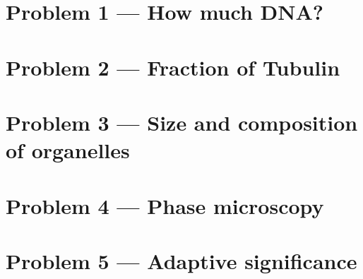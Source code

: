 \documentclass[11pt]{article}
\begin{document}
\section{Problem 1 --- How much DNA?}


\section{Problem 2 --- Fraction of Tubulin}


\section{Problem 3 --- Size and composition of organelles}


\section{Problem 4 --- Phase microscopy}


\section{Problem 5 --- Adaptive significance}

\cite{gerhart, alon, lynch}

{}

\end{document}
